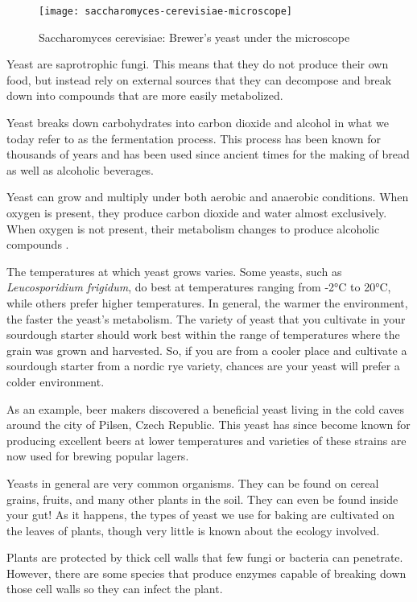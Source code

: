 \begin{figure}[!htb]
  \centering
  \texttt{[image: saccharomyces-cerevisiae-microscope]}
  \caption{Saccharomyces cerevisiae: Brewer's yeast under the microscope}
  \label{saccharomyces-cerevisiae-microscope}
\end{figure}

Yeast are saprotrophic fungi. This means that they do not produce their own
food, but instead rely on external sources that they can decompose and break
down into compounds that are more easily metabolized.

Yeast breaks down carbohydrates into carbon dioxide and alcohol in what we today
refer to as the fermentation process. This process has been known for thousands
of years and has been used since ancient times for the making of bread as well
as alcoholic beverages.

Yeast can grow and multiply under both aerobic and anaerobic conditions. When
oxygen is present, they produce carbon dioxide and water almost exclusively.
When oxygen is not present, their metabolism changes to produce alcoholic
compounds \cite{effects+oxygen+yeast+growth}.

The temperatures at which yeast grows varies. Some yeasts, such as
{\it Leucosporidium frigidum}, do best at temperatures ranging from -2°C to
20°C, while others prefer higher temperatures. In general, the warmer the
environment, the faster the yeast's metabolism. The variety of yeast
that you cultivate in your sourdough starter should work best within the range
of temperatures where the grain was grown and harvested. So, if you are from a 
cooler place and cultivate a sourdough starter from a nordic rye variety,
chances are your yeast will prefer a colder environment.

As an example, beer makers discovered a beneficial yeast living in the cold
caves around the city of Pilsen, Czech Republic. This yeast has since become
known for producing excellent beers at lower temperatures and varieties of
these strains are now used for brewing popular lagers.

Yeasts in general are very common organisms. They can be found on cereal
grains, fruits, and many other plants in the soil. They can even be found
inside your gut! As it happens, the types of yeast we use for baking are
cultivated on the leaves of plants, though very little is known about the
ecology involved.

Plants are protected by thick cell walls that few fungi or bacteria can
penetrate. However, there are some species that produce enzymes capable of
breaking down those cell walls so they can infect the plant.

